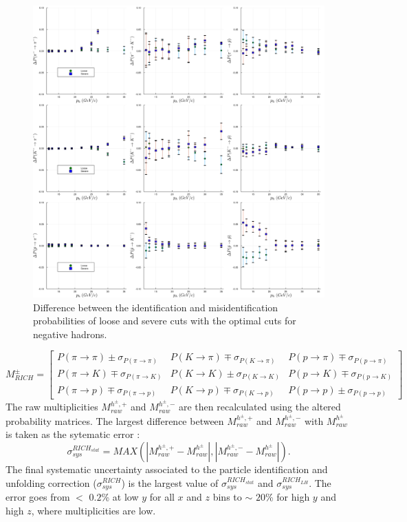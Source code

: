 \begin{figure}[!p]
	\centering
	\includegraphics[scale=0.1]{./gfx/SysMinus.png}
	\caption{Difference between the identification and misidentification probabilities of loose and severe cuts with the optimal cuts for negative hadrons.}
	\label{pic:Sysminus}
\end{figure}
%
\begin{equation}
  M^{\pm}_{RICH}
  =
  \begin{bmatrix}
  P(\pi \rightarrow \pi)\pm\sigma_{P(\pi \rightarrow \pi)} & P(K \rightarrow \pi)\mp\sigma_{P(K \rightarrow \pi)} & P(p \rightarrow \pi)\mp\sigma_{P(p \rightarrow \pi)}\\
  P(\pi \rightarrow K)\mp\sigma_{P(\pi \rightarrow K)} & P(K \rightarrow K)\pm\sigma_{P(K \rightarrow K)} & P(p \rightarrow K)\mp\sigma_{P(p \rightarrow K)} \\
  P(\pi \rightarrow p)\mp\sigma_{P(\pi \rightarrow p)} & P(K \rightarrow p)\mp\sigma_{P(K \rightarrow p)} & P(p \rightarrow p)\pm\sigma_{P(p \rightarrow p)}
  \end{bmatrix}
	\label{eq:StatMat}
\end{equation}
%
The raw multiplicities $M^{h^{\pm},+}_{raw}$ and $M^{h^{\pm},-}_{raw}$ are then recalculated using the altered probability matrices. The largest difference between
$M^{h^{\pm},+}_{raw}$ and $M^{h^{\pm},-}_{raw}$ with $M^{h^{\pm}}_{raw}$ is taken as the sytematic error :
%
\begin{equation}
  \sigma^{RICH_{stat}}_{sys} = MAX(|M^{h^{\pm},+}_{raw}-M^{h^{\pm}}_{raw}|,|M^{h^{\pm},-}_{raw}-M^{h^{\pm}}_{raw}|).
\end{equation}
%
The final systematic uncertainty associated to the particle identification and unfolding correction ($\sigma^{RICH}_{sys}$) is the largest value of $\sigma^{RICH_{stat}}_{sys}$ and $\sigma^{RICH_{LH}}_{sys}$. The error goes from $<$ $0.2$\% at low $y$ for all $x$ and $z$ bins to $\sim$ $20$\% for high $y$ and high $z$, where multiplicities are low.

